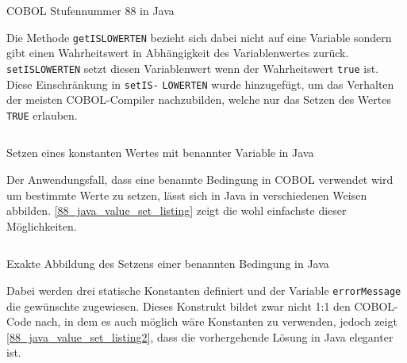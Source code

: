 \begin{listing}[H]
  \inputminted{java}{Code/88_section.java}
  \caption{COBOL Stufennummer 88 in Java}
  \label{88_java_listing}
\end{listing} 

Die Methode \texttt{getISLOWERTEN} bezieht sich dabei nicht auf eine Variable sondern gibt einen Wahrheitswert in Abhängigkeit des Variablenwertes zurück. \texttt{setISLOWERTEN} setzt diesen Variablenwert wenn der Wahrheitswert \texttt{true} ist. Diese Einschränkung in \texttt{setIS-} \texttt{LOWERTEN} wurde hinzugefügt, um das Verhalten der meisten COBOL-Compiler nachzubilden, welche nur das Setzen des Wertes \texttt{TRUE} erlauben.

\begin{listing}[H]
  \inputminted{java}{Code/88_section_value_set.java}
  \caption{Setzen eines konstanten Wertes mit benannter Variable in Java}
  \label{88_java_value_set_listing}
\end{listing} 

Der Anwendungsfall, dass eine benannte Bedingung in COBOL verwendet wird um bestimmte Werte zu setzen, lässt sich in Java in verschiedenen Weisen abbilden. \autoref{88_java_value_set_listing} zeigt die wohl einfachste dieser Möglichkeiten.

\begin{listing}[H]
  \inputminted{java}{Code/88_section_value_set2.java}
  \caption{Exakte Abbildung des Setzens einer benannten Bedingung in Java}
  \label{88_java_value_set_listing2}
\end{listing} 

Dabei werden drei statische Konstanten definiert und der Variable \texttt{errorMessage} die gewünschte zugewiesen. Dieses Konstrukt bildet zwar nicht 1:1 den COBOL-Code nach, in dem es auch möglich wäre Konstanten zu verwenden, jedoch zeigt \autoref{88_java_value_set_listing2}, dass die vorhergehende Lösung in Java eleganter ist.
